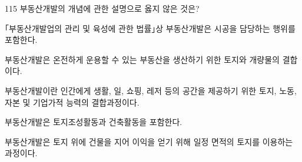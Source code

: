 \begin{question}{115}
부동산개발의 개념에 관한 설명으로 옳지 않은 것은?
\begin{choices}
  \item ｢부동산개발업의 관리 및 육성에 관한 법률｣상 부동산개발은 시공을 담당하는 행위를 포함한다.
  \item 부동산개발은 온전하게 운용할 수 있는 부동산을 생산하기 위한 토지와 개량물의 결합이다.
  \item 부동산개발이란 인간에게 생활, 일, 쇼핑, 레저 등의 공간을 제공하기 위한 토지, 노동, 자본 및 기업가적 능력의 결합과정이다.
  \item 부동산개발은 토지조성활동과 건축활동을 포함한다.
  \item 부동산개발은 토지 위에 건물을 지어 이익을 얻기 위해 일정 면적의 토지를 이용하는 과정이다.
\end{choices}
\end{question}
